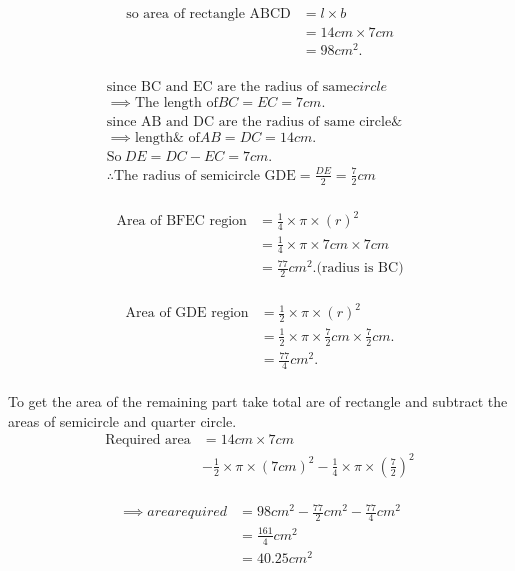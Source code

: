 \documentclass[11pt,a4paper]{article}
\newcommand{\rectarea}[2]{#1 \times #2}
\newcommand{\semicirarea}[1]{\frac{1}{2} \times \pi \times (#1)^2}
\newcommand{\quatercirarea}[1]{\frac{1}{4} \times \pi \times (#1)^2}
\begin{document}
\begin{multicols}{2}
\begin{center}
 \begin{align*}
    \text{so area of rectangle ABCD}&= \rectarea{l}{b} \\
                 &= \rectarea{14cm}{7cm} \\
                 &= 98cm^2.\\
  \end{align*}
\end{center}
\columnbreak

  \begin{center}
  \begin{align*}
        \text{since BC and EC are the radius of same} circle&\\
    \implies \text{The length of} BC = EC = 7cm.&\\
        \text{since AB and DC are the radius of same circle&}\\
    \implies \text{length& of}AB = DC = 14cm.& \\ 
                     \text{So}\ DE=DC-EC =7cm.& \\ 
\therefore \text{The radius of semicircle GDE} =\frac{DE}{2}=\frac{7}{2}cm&\\
 \end{align*}
    \end{center}
  
\begin{align*}
\text{Area of BFEC region} &= \quatercirarea{r} \\
&= \frac{1}{4} \times \pi \times 7cm \times 7cm\\ 
               &= \frac{77}{2}cm^2.\text{(radius is BC)}\\
\end{align*}

\begin{align*}
\text{Area of GDE region} &= \semicirarea{r} \\
               &=\frac{1}{2} \times \pi \times \frac{7}{2}cm \times \frac{7}{2}cm.\\
                          &= \frac{77}{4}cm^2.\\
\end{align*}
      
To get the area of the remaining part take total are of rectangle
and subtract the areas of semicircle and quarter circle.
\begin{align*}
    \text{Required area} &= \rectarea{14cm}{7cm} \\
                     &- \semicirarea{7cm} - \quatercirarea{\frac{7}{2}} \\
\end{align*}

   
\begin{align*}
\implies area required &=98cm^{2} - \frac{77}{2}cm^{2} - \frac{77}{4}cm^{2}\\ 
&= \frac{161}{4}cm^{2} \\
&= 40.25cm^{2}  \\
    \end{align*}
\end{multicols}
\end{document}
